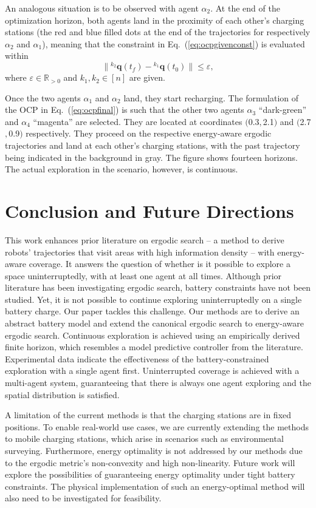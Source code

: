 \documentclass[letterpaper,10pt,conference,twoside]{IEEEtran}
\theoremstyle{definition}
\begin{document}
An analogous situation is to be observed with agent $\alpha_2$. At the end of the optimization horizon, both agents land in the proximity of each other's charging stations (the red and blue filled dots at the end of the trajectories for respectively $\alpha_2$ and $\alpha_1$), meaning that the constraint in Eq.~(\ref{eq:ocpgivenconst}) is evaluated within
\begin{equation}
  \lVert{}^{k_2}\mathbf{q}(t_f)-{}^{k_1}\mathbf{q}(t_0)\rVert\leq\varepsilon,
\end{equation} 
where $\varepsilon\in\mathbb{R}_{>0}$ and $k_1,k_2\in[n]$ are given.

Once the two agents $\alpha_1$ and $\alpha_2$ land, they start recharging. The formulation of the OCP in Eq.~(\ref{eq:ocpfinal}) is such that the other two agents $\alpha_3$ ``dark-green'' and $\alpha_4$ ``magenta'' are selected. They are located at coordinates $($0.3$,$2.1$)$ and $($2.7$,$0.9$)$ respectively. They proceed on the respective energy-aware ergodic trajectories and land at each other's charging stations, with the past trajectory being indicated in the background in gray. The figure shows fourteen horizons. The actual exploration in the scenario, however, is continuous. 


\section{Conclusion and Future Directions}\label{sec:conc}
\noindent
This work enhances prior literature on ergodic search -- a method to derive robots' trajectories that visit areas with high information density -- with energy-aware coverage. It answers the question of whether is it possible to explore a space uninterruptedly, with at least one agent at all times. Although prior literature has been investigating ergodic search, battery constraints have not been studied. Yet, it is not possible to continue exploring uninterruptedly on a single battery charge. Our paper tackles this challenge. Our methods are to derive an abstract battery model and extend the canonical ergodic search to energy-aware ergodic search. Continuous exploration is achieved using an empirically derived finite horizon, which resembles a model predictive controller from the literature. Experimental data indicate the effectiveness of the battery-constrained exploration with a single agent first. Uninterrupted coverage is achieved with a multi-agent system, guaranteeing that there is always one agent exploring and the spatial distribution is satisfied.

A limitation of the current methods is that the charging stations are in fixed positions. To enable real-world use cases, we are currently extending the methods to mobile charging stations, which arise in scenarios such as environmental surveying. Furthermore, energy optimality is not addressed by our methods due to the ergodic metric's non-convexity and high non-linearity. Future work will explore the possibilities of guaranteeing energy optimality under tight battery constraints. The physical implementation of such an energy-optimal method will also need to be investigated for feasibility.

{\small
 

}
\end{document}
